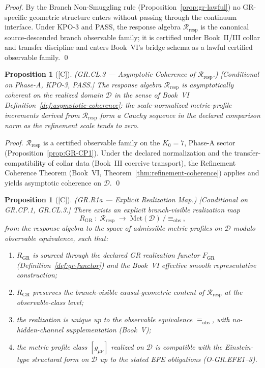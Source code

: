 \documentclass[12pt,oneside]{amsbook}
\theoremstyle{plain}
\newtheorem{proposition}[theorem]{Proposition}
\theoremstyle{definition}
\theoremstyle{remark}
\newcommand{\status}[1]{\textup{[#1]}}
\begin{document}
\begin{proof}
By the Branch Non-Smuggling rule (Proposition~\ref{prop:gr-lawful})
no GR-specific geometric structure enters without passing through
the continuum interface. Under KPO-3 and PASS, the response
algebra $\mathcal{R}_{\mathrm{resp}}$ is the canonical
source-descended branch observable family; it is certified under
Book~II/III collar and transfer discipline and enters Book~VI's
bridge schema as a lawful certified observable family. \qed
\end{proof}

\begin{proposition}[\status{C}]\label{prop:GR-CL3}
\textup{(GR.CL.3 --- Asymptotic Coherence of $\mathcal{R}_{\mathrm{resp}}$.)}
\textup{[Conditional on Phase-A, KPO-3, PASS.]}
The response algebra $\mathcal{R}_{\mathrm{resp}}$ is
asymptotically coherent on the realized domain $\mathcal{D}$ in
the sense of Book~VI Definition~\ref{def:asymptotic-coherence}:
the scale-normalized metric-profile increments derived from
$\mathcal{R}_{\mathrm{resp}}$ form a Cauchy sequence in the
declared comparison norm as the refinement scale tends to zero.
\end{proposition}

\begin{proof}
$\mathcal{R}_{\mathrm{resp}}$ is a certified observable family on
the $K_0=7$, Phase-A sector (Proposition~\ref{prop:GR-CP1}).
Under the declared normalization and the transfer-compatibility of
collar data (Book~III coercive transport), the Refinement Coherence
Theorem (Book~VI, Theorem~\ref{thm:refinement-coherence}) applies
and yields asymptotic coherence on $\mathcal{D}$. \qed
\end{proof}

\begin{proposition}[\status{C}]\label{prop:GR-R1a}
\textup{(GR.R1a --- Explicit Realization Map.)}
\textup{[Conditional on GR.CP.1, GR.CL.3.]}
There exists an explicit branch-visible realization map
\[
 R_{\mathrm{GR}} \;:\; \mathcal{R}_{\mathrm{resp}}
 \;\longrightarrow\; \mathrm{Met}(\mathcal{D})\,/\!\equiv_{\mathrm{obs}},
\]
from the response algebra to the space of admissible metric profiles
on $\mathcal{D}$ modulo observable equivalence, such that:
\begin{enumerate}[label=\textup{(\roman*)}]
 \item $R_{\mathrm{GR}}$ is sourced through the declared GR
 realization functor $F_{\mathrm{GR}}$
 (Definition~\ref{def:gr-functor}) and the Book~VI effective
 smooth representative construction;
 \item $R_{\mathrm{GR}}$ preserves the branch-visible
 causal-geometric content of $\mathcal{R}_{\mathrm{resp}}$ at
 the observable-class level;
 \item the realization is unique up to the observable equivalence
 $\equiv_{\mathrm{obs}}$, with no-hidden-channel supplementation
 (Book~V);
 \item the metric profile class $[g_{\mu\nu}]$ realized on
 $\mathcal{D}$ is compatible with the Einstein-type structural
 form on $\mathcal{D}$ up to the stated EFE obligations
 (O-GR.EFE1--3).
\end{enumerate}
\end{proposition}
\end{document}
